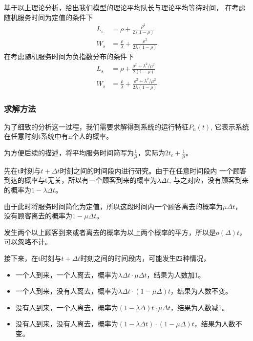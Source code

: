     基于以上理论分析，给出我们模型的理论平均队长与理论平均等待时间，
    在考虑随机服务时间为定值的条件下
    \begin{equation}
        \begin{aligned}
            L_s & =\rho +\frac{\rho^2 }{2(1-\rho)} \\
            W_s &=\frac{\rho}{\lambda} +\frac{\rho^2}{2\lambda (1-\rho)}
        \end{aligned}
    \end{equation}
    在考虑随机服务时间为负指数分布的条件下
    \begin{equation}
        \begin{aligned}
            L_s & =\rho +\frac{\rho^2 +\lambda^2 /\mu^2}{2(1-\rho)} \\
            W_s &=\frac{\rho}{\lambda} +\frac{\rho^2 +\lambda^2 /\mu^2}{2\lambda (1-\rho)}
        \end{aligned}
    \end{equation}

\subsubsection{求解方法}
    为了细致的分析这一过程，我们需要求解得到系统的运行特征$P_n(t)$,
    它表示系统在任意时刻t系统中有n个人的概率。
    
    为方便后续的描述，将平均服务时间简写为$\frac{1}{\mu}$，实际为$2t_c+\frac{1}{\mu}$。
    
    先在t时刻与$t+\Delta t$时刻之间的时间段内进行研究。由于在任意时间段内
    一个顾客到达的概率与t无关，所以有一个顾客到来的概率为$\lambda \Delta t$,
    与之对应，没有顾客到来的概率为$1- \lambda \Delta t$。
    
    由于此时将服务时间简化为定值，所以这段时间内一个顾客离去的概率为$\mu \Delta t$，
    没有顾客离去的概率为$1-\mu \Delta t$。
    
    发生两个以上顾客到来或者离去的概率为以上两个概率的平方，所以是$o(\Delta)t$，可以忽略不计。
    
    接下来，在t时刻与$t+\Delta t$时刻之间的时间段内，可能发生四种情况，
    \begin{itemize}
    \item 一个人到来，一个人离去，概率为$\lambda \Delta t \cdot \mu \Delta t$，结果为人数加1。
    \item 一个人到来，没有人离去，概率为$\lambda \Delta t \cdot (1-\mu \Delta) t$，结果为人数不变。
    \item 没有人到来，一个人离去，概率为$(1-\lambda \Delta) t \cdot \mu \Delta t$，结果为人数减1。
    \item 没有人到来，没有人离去，概率为$(1-\lambda \Delta t) \cdot (1-\mu \Delta) t$，结果为人数不变。
    \end{itemize}
    
